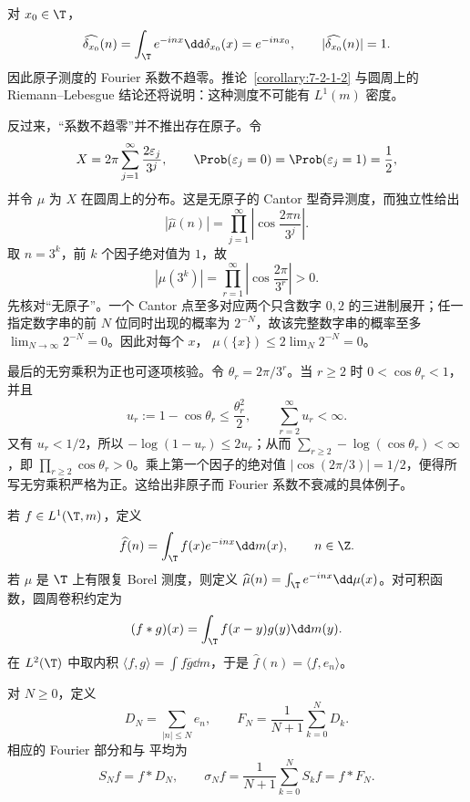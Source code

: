 \begin{example}[原子测度]\label{ex:7-2-1-3}
对 $x_0\in\T$，
\[
 \widehat{\delta_{x_0}}(n)
 =\int_\T e^{-inx}\dd\delta_{x_0}(x)=e^{-inx_0},
 \qquad |\widehat{\delta_{x_0}}(n)|=1.
\]
因此原子测度的 Fourier 系数不趋零。推论~\ref{corollary:7-2-1-2} 与圆周上的
Riemann--Lebesgue 结论还将说明：这种测度不可能有 $L^1(m)$ 密度。

反过来，“系数不趋零”并不推出存在原子。令
\[
 X=2\pi\sum_{j=1}^\infty\frac{2\varepsilon_j}{3^j},
 \qquad \Prob(\varepsilon_j=0)=\Prob(\varepsilon_j=1)=\frac12,
\]
并令 $\mu$ 为 $X$ 在圆周上的分布。这是无原子的 Cantor 型奇异测度，而独立性给出
\[
 |\widehat\mu(n)|
 =\prod_{j=1}^\infty\left|\cos\frac{2\pi n}{3^j}\right|.
\]
取 $n=3^k$，前 $k$ 个因子绝对值为 $1$，故
\[
 |\widehat\mu(3^k)|
 =\prod_{r=1}^\infty\left|\cos\frac{2\pi}{3^r}\right|>0.
\]
先核对“无原子”。一个 Cantor 点至多对应两个只含数字 $0,2$ 的三进制展开；任一指定数字串的前
$N$ 位同时出现的概率为 $2^{-N}$，故该完整数字串的概率至多
$\lim_{N\to\infty}2^{-N}=0$。因此对每个 $x$，
$\mu(\{x\})\leq2\lim_N2^{-N}=0$。

最后的无穷乘积为正也可逐项核验。令 $\theta_r=2\pi/3^r$。当 $r\geq2$ 时
$0<\cos\theta_r<1$，并且
\[
 u_r:=1-\cos\theta_r\leq\frac{\theta_r^2}{2},
 \qquad \sum_{r=2}^\infty u_r<\infty.
\]
又有 $u_r<1/2$，所以 $-\log(1-u_r)\leq2u_r$；从而
$\sum_{r\geq2}-\log(\cos\theta_r)<\infty$，即
$\prod_{r\geq2}\cos\theta_r>0$。乘上第一个因子的绝对值
$|\cos(2\pi/3)|=1/2$，便得所写无穷乘积严格为正。这给出非原子而 Fourier 系数不衰减的具体例子。
\end{example}

\begin{definition}[Fourier 系数]\label{def:7-2-1-1}
若 $f\in L^1(\T,m)$，定义
\[
 \widehat f(n)=\int_\T f(x)e^{-inx}\dd m(x),\qquad n\in\Z.
\]
若 $\mu$ 是 $\T$ 上有限复 Borel 测度，则定义
$\widehat\mu(n)=\int_\T e^{-inx}\dd\mu(x)$。对可积函数，圆周卷积约定为
\[
 (f*g)(x)=\int_\T f(x-y)g(y)\dd m(y).
\]
在 $L^2(\T)$ 中取内积 $\langle f,g\rangle=\int f\overline g\dd m$，于是
$\widehat f(n)=\langle f,e_n\rangle$。
\end{definition}

\begin{definition}\label{def:7-2-1-2}
对 $N\geq0$，定义
\[
 D_N=\sum_{|n|\leq N}e_n,
 \qquad
 F_N=\frac1{N+1}\sum_{k=0}^ND_k.
\]
相应的 Fourier 部分和与 \Fejer{} 平均为
\[
 S_Nf=f*D_N,
 \qquad
 \sigma_Nf=\frac1{N+1}\sum_{k=0}^NS_kf=f*F_N.
\]
\end{definition}


